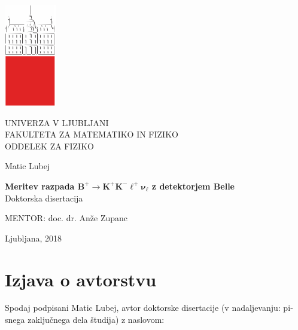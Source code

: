 \cleardoublepage
\begin{otherlanguage}{slovene}
\begin{center}

\includegraphics{fig/logo2}

{\large UNIVERZA V LJUBLJANI\\
FAKULTETA ZA MATEMATIKO IN FIZIKO\\
ODDELEK ZA FIZIKO\\}

\vspace{5cm}

{\Large Matic Lubej\\}

\vspace{10mm}

{\bf \Large Meritev razpada $\bm{B^+ \to K^+K^-\ell^+\nu_\ell}$ z detektorjem Belle\\}
\vspace{5mm}
{\large Doktorska disertacija}\\

\vfill

{\large MENTOR: doc. dr. An\v ze Zupanc\\
}



\vspace{2cm}

{\large Ljubljana, 2018}

\end{center}

\cleardoublepage

\chapter*{Izjava o avtorstvu}
\thispagestyle{empty}

Spodaj podpisani Matic Lubej, avtor doktorske disertacije (v nadaljevanju: pisnega zaključnega dela študija) z naslovom:\\


\end{otherlanguage}
